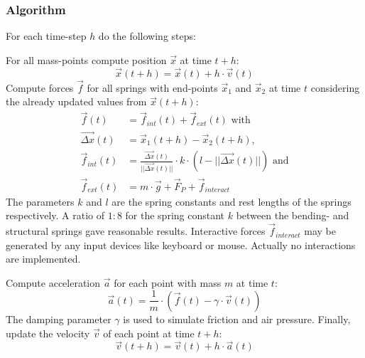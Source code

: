 \subsubsection{Algorithm}
For each time-step $h$ do the following steps:\par
For all mass-points compute position $\vec{x}$ at time $t+h$:
\begin{equation}
	\vec{x}(t+h) = \vec{x}(t) + h \cdot \vec{v}(t)
\end{equation}      
Compute forces $\vec{f}$ for all springs with end-points $\vec{x}_1$ and $\vec{x}_2$ at time $t$ considering the already updated values from $\vec{x}(t+h)$:
\begin{align}
	\vec{f}(t)          &= \vec{f}_{int}(t) + \vec{f}_{ext}(t) \text{ with} \\
	\vec{\Delta x}(t)   &= \vec{x}_1(t+h)-\vec{x}_2(t+h) \text{,}\\
	\vec{f}_{int}(t)    &= \frac{\vec{\Delta x}(t)}
	                       {||\vec{\Delta x}(t)||} \cdot k \cdot
	                       \left( l - ||\vec{\Delta x}(t)||\right) 
	                       \text{ and} \\
	\vec{f}_{ext}(t)    &= m \cdot \vec{g} + \vec{F}_P + \vec{f}_{interact}
\end{align}
The parameters $k$ and $l$ are the spring constants and rest lengths of the springs respectively. A ratio of $1 : 8$ for the spring constant $k$ between the bending- and structural springs gave reasonable results.
Interactive forces $\vec{f}_{interact}$ may be generated by any input devices like keyboard or mouse. Actually no interactions are implemented.
\par
Compute acceleration $\vec{a}$ for each point with mass $m$ at time $t$:
\begin{equation}
	\vec{a}(t) = \frac{1}{m} \cdot (\vec{f}(t) - \gamma \cdot \vec{v}(t))
\end{equation}
The damping parameter $\gamma$ is used to simulate friction and air pressure.
Finally, update the velocity $\vec{v}$ of each point at time $t+h$:
\begin{equation}
	\vec{v}(t+h) = \vec{v}(t) + h \cdot \vec{a}(t)
\end{equation}
